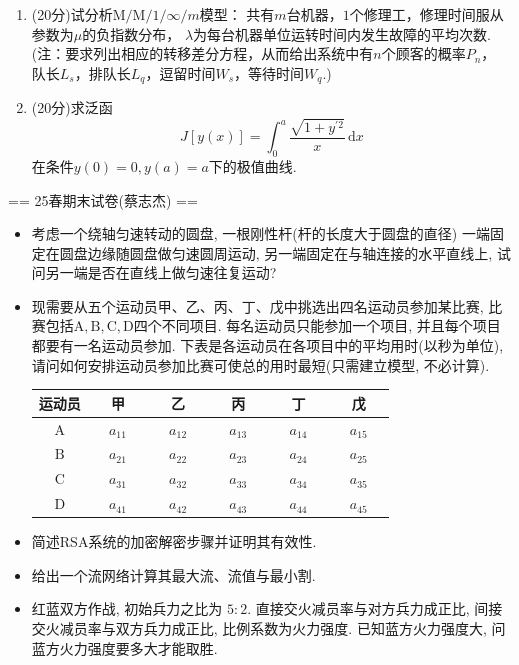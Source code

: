 \begin{enumerate}
\item (20分)试分析$\text{M}/\text{M}/1/\infty/m$模型：
共有$m$台机器，$1$个修理工，修理时间服从参数为$\mu$的负指数分布，
$\lambda$为每台机器单位运转时间内发生故障的平均次数.\\
(注：要求列出相应的转移差分方程，从而给出系统中有$n$个顾客的概率$P_{n}$，
队长$L_{s}$，排队长$L_{q}$，逗留时间$W_{s}$，等待时间$W_{q}$.)

\item (20分)求泛函
\[J[y(x)]=\int_{0}^{a}\frac{\sqrt{1+y^{\prime2}}}{x} \,\mathrm{d}x\]
在条件$y(0)=0,y(a)=a$下的极值曲线.
\end{enumerate}

== 25春期末试卷(蔡志杰) ==

\begin{itemize}
	\item[1.] 考虑一个绕轴匀速转动的圆盘, 一根刚性杆(杆的长度大于圆盘的直径)
	一端固定在圆盘边缘随圆盘做匀速圆周运动, 另一端固定在与轴连接的水平直线上, 
	试问另一端是否在直线上做匀速往复运动? 
	
	
	\item[2.] 现需要从五个运动员甲、乙、丙、丁、戊中挑选出四名运动员参加某比赛, 
	比赛包括$\text{A}, \text{B}, \text{C}, \text{D}$四个不同项目. 
    每名运动员只能参加一个项目, 并且每个项目都要有一名运动员参加. 
    下表是各运动员在各项目中的平均用时(以秒为单位), 
    请问如何安排运动员参加比赛可使总的用时最短(只需建立模型, 不必计算). 
	
    \begin{table}\begin{tabular}{|c|c|c|c|c|c|}
	\hline               
	运动员 &\ \ 甲\ \ &\ \ 乙\ \ &\ \ 丙\ \ &\ \ 丁\ \ &\ \ 戊\ \ \\ 
	\hline
	$\text{A}$ & $a_{11}$ &$a_{12}$ &$a_{13}$ &$a_{14}$&$a_{15}$ \\
	\hline
	$\text{B}$ & $a_{21}$ &$a_{22}$ &$a_{23}$ &$a_{24}$ &$a_{25}$ \\
	\hline
	$\text{C}$ & $a_{31}$ &$a_{32}$&$a_{33}$ &$a_{34}$ &$a_{35}$ \\
	\hline
	$\text{D}$ & $a_{41}$ &$a_{42}$&$a_{43}$ &$a_{44}$ &$a_{45}$ 
	\end{tabular}\end{table}
	
	\item[3.] 简述RSA系统的加密解密步骤并证明其有效性.
	
	\item[4.] 给出一个流网络计算其最大流、流值与最小割.
	
	\item[5.] 红蓝双方作战, 初始兵力之比为 $5:2$. 直接交火减员率与对方兵力成正比, 
	间接交火减员率与双方兵力成正比, 比例系数为火力强度. 已知蓝方火力强度大, 
	问蓝方火力强度要多大才能取胜.
\end{itemize}

